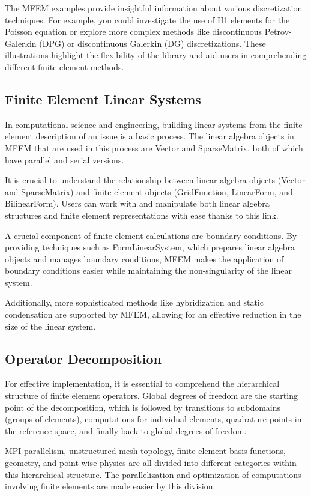 \documentclass{article}
\begin{document}
The MFEM examples provide insightful information about various discretization techniques. For example, you could investigate the use of H1 elements for the Poisson equation or explore more complex methods like discontinuous Petrov-Galerkin (DPG) or discontinuous Galerkin (DG) discretizations. These illustrations highlight the flexibility of the library and aid users in comprehending different finite element methods.

\subsection{Finite Element Linear Systems}
In computational science and engineering, building linear systems from the finite element description of an issue is a basic process. The linear algebra objects in MFEM that are used in this process are Vector and SparseMatrix, both of which have parallel and serial versions.

It is crucial to understand the relationship between linear algebra objects (Vector and SparseMatrix) and finite element objects (GridFunction, LinearForm, and BilinearForm). Users can work with and manipulate both linear algebra structures and finite element representations with ease thanks to this link.

A crucial component of finite element calculations are boundary conditions. By providing techniques such as FormLinearSystem, which prepares linear algebra objects and manages boundary conditions, MFEM makes the application of boundary conditions easier while maintaining the non-singularity of the linear system.

Additionally, more sophisticated methods like hybridization and static condensation are supported by MFEM, allowing for an effective reduction in the size of the linear system.

\subsection{Operator Decomposition}
For effective implementation, it is essential to comprehend the hierarchical structure of finite element operators. Global degrees of freedom are the starting point of the decomposition, which is followed by transitions to subdomains (groups of elements), computations for individual elements, quadrature points in the reference space, and finally back to global degrees of freedom.

MPI parallelism, unstructured mesh topology, finite element basis functions, geometry, and point-wise physics are all divided into different categories within this hierarchical structure. The parallelization and optimization of computations involving finite elements are made easier by this division.
\end{document}

